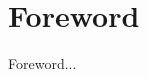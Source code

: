 
\begingroup
\let\clearpage\relax
\let\cleardoublepage\relax

\chapter{Foreword}
\label{chap:foreword}

Foreword...

\endgroup

